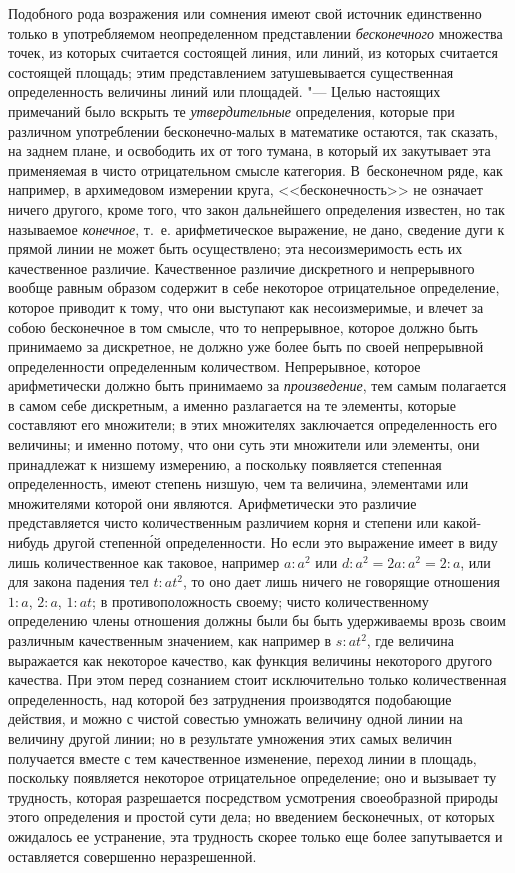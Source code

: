 Подобного рода возражения или сомнения имеют свой источник единственно
только в употребляемом неопределенном представлении
{\em бесконечного} множества точек, из которых
считается состоящей линия, или линий, из которых считается состоящей
площадь; этим представлением затушевывается существенная определенность
величины линий или площадей. "--- Целью настоящих примечаний было вскрыть те
{\em утвердительные} определения, которые при различном
употреблении бесконечно-малых в математике остаются, так сказать, на заднем
плане, и освободить их от того тумана, в который их закутывает эта
применяемая в чисто отрицательном смысле категория. В~бесконечном ряде, как
например, в архимедовом измерении круга, <<бесконечность>> не означает ничего
другого, кроме того, что закон дальнейшего определения известен, но так
называемое {\em конечное}, т.~е. арифметическое
выражение, не дано, сведение дуги к прямой линии не может быть
осуществлено; эта несоизмеримость есть их качественное различие.
Качественное различие дискретного и непрерывного вообще равным образом
содержит в себе некоторое отрицательное определение, которое приводит к
тому, что они выступают как несоизмеримые, и влечет за собою бесконечное в
том смысле, что то непрерывное, которое должно быть принимаемо за
дискретное, не должно уже более быть по своей непрерывной определенности
определенным количеством. Непрерывное, которое арифметически должно быть
принимаемо за {\em произведение}, тем самым полагается
в самом себе дискретным, а именно разлагается на те элементы, которые
составляют его множители; в этих множителях заключается определенность его
величины; и именно потому, что они суть эти множители или элементы, они
принадлежат к низшему измерению, а поскольку появляется степенная
определенность, имеют степень низшую, чем та величина, элементами или
множителями которой они являются. Арифметически это различие представляется
чисто количественным различием корня и степени или какой-нибудь другой
степенн\'{о}й определенности. Но если это выражение имеет в виду лишь
количественное как таковое, например $a : a^2$ или
$d : a^2 = 2a : a^2 = 2 : a$, или для закона падения тел
$t : at^2$, то оно дает лишь ничего не говорящие отношения
$1 : a$, $2:a$, $1 : at$; в противоположность своему; чисто
количественному определению члены отношения должны были бы быть удерживаемы
врозь своим различным качественным значением, как например в
$s : at^2$, где величина выражается как некоторое качество,
как функция величины некоторого другого качества. При этом перед сознанием
стоит исключительно только количественная определенность, над которой без
затруднения производятся подобающие действия, и можно с чистой совестью
умножать величину одной линии на величину другой линии; но в результате
умножения этих самых величин получается вместе с тем качественное
изменение, переход линии в площадь, поскольку появляется некоторое
отрицательное определение; оно и вызывает ту трудность, которая разрешается
посредством усмотрения своеобразной природы этого определения и простой
сути дела; но введением бесконечных, от которых ожидалось ее устранение,
эта трудность скорее только еще более запутывается и оставляется совершенно
неразрешенной.
